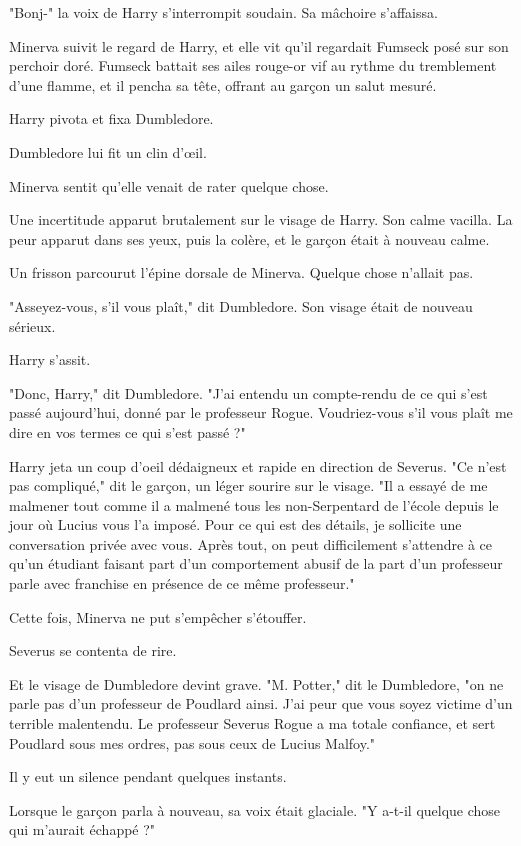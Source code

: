 "Bonj-" la voix de Harry s'interrompit soudain. Sa mâchoire s'affaissa.

Minerva suivit le regard de Harry, et elle vit qu'il regardait Fumseck posé sur son perchoir doré. Fumseck battait ses ailes rouge-or vif au rythme du tremblement d'une flamme, et il pencha sa tête, offrant au garçon un salut mesuré.

Harry pivota et fixa Dumbledore.

Dumbledore lui fit un clin d'œil.

Minerva sentit qu'elle venait de rater quelque chose.

Une incertitude apparut brutalement sur le visage de Harry. Son calme vacilla. La peur apparut dans ses yeux, puis la colère, et le garçon était à nouveau calme.

Un frisson parcourut l'épine dorsale de Minerva. Quelque chose n'allait pas.

"Asseyez-vous, s'il vous plaît," dit Dumbledore. Son visage était de nouveau sérieux.

Harry s'assit.

"Donc, Harry," dit Dumbledore. "J'ai entendu un compte-rendu de ce qui s'est passé aujourd'hui, donné par le professeur Rogue. Voudriez-vous s'il vous plaît me dire en vos termes ce qui s'est passé ?"

Harry jeta un coup d'oeil dédaigneux et rapide en direction de Severus. "Ce n'est pas compliqué," dit le garçon, un léger sourire sur le visage. "Il a essayé de me malmener tout comme il a malmené tous les non-Serpentard de l'école depuis le jour où Lucius vous l'a imposé. Pour ce qui est des détails, je sollicite une conversation privée avec vous. Après tout, on peut difficilement s'attendre à ce qu'un étudiant faisant part d'un comportement abusif de la part d'un professeur parle avec franchise en présence de ce même professeur."

Cette fois, Minerva ne put s'empêcher s'étouffer.

Severus se contenta de rire.

Et le visage de Dumbledore devint grave. "M. Potter," dit le Dumbledore, "on ne parle pas d'un professeur de Poudlard ainsi. J'ai peur que vous soyez victime d'un terrible malentendu. Le professeur Severus Rogue a ma totale confiance, et sert Poudlard sous mes ordres, pas sous ceux de Lucius Malfoy."

Il y eut un silence pendant quelques instants.

Lorsque le garçon parla à nouveau, sa voix était glaciale. "Y a-t-il quelque chose qui m'aurait échappé ?"

